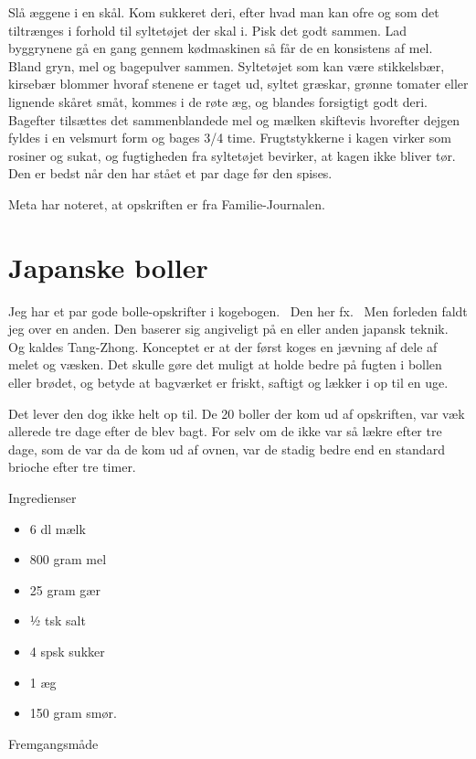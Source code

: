 \documentclass[
  letterpaper,
  DIV=11,
  numbers=noendperiod]{scrreprt}
\providecommand{\tightlist}{%
  \setlength{\itemsep}{0pt}\setlength{\parskip}{0pt}}\usepackage{longtable,booktabs,array}
\begin{document}
Slå æggene i en skål. Kom sukkeret deri, efter hvad man kan ofre og som
det tiltrænges i forhold til syltetøjet der skal i. Pisk det godt
sammen. Lad byggrynene gå en gang gennem kødmaskinen så får de en
konsistens af mel. Bland gryn, mel og bagepulver sammen. Syltetøjet som
kan være stikkelsbær, kirsebær blommer hvoraf stenene er taget ud,
syltet græskar, grønne tomater eller lignende skåret småt, kommes i de
røte æg, og blandes forsigtigt godt deri. Bagefter tilsættes det
sammenblandede mel og mælken skiftevis hvorefter dejgen fyldes i en
velsmurt form og bages 3/4 time. Frugtstykkerne i kagen virker som
rosiner og sukat, og fugtigheden fra syltetøjet bevirker, at kagen ikke
bliver tør. Den er bedst når den har stået et par dage før den spises.

Meta har noteret, at opskriften er fra Familie-Journalen.

\hypertarget{japanske-boller-1}{%
\section{Japanske boller}\label{japanske-boller-1}}

Jeg har et par gode bolle-opskrifter i kogebogen.~ Den her fx. ~Men
forleden faldt jeg over en anden. Den baserer sig angiveligt på en eller
anden japansk teknik. Og kaldes Tang-Zhong. Konceptet er at der først
koges en jævning af dele af melet og væsken. Det skulle gøre det muligt
at holde bedre på fugten i bollen eller brødet, og betyde at bagværket
er friskt, saftigt og lækker i op til en uge.

Det lever den dog ikke helt op til. De 20 boller der kom ud af
opskriften, var væk allerede tre dage efter de blev bagt. For selv om de
ikke var så lækre efter tre dage, som de var da de kom ud af ovnen, var
de stadig bedre end en standard brioche efter tre timer.

Ingredienser

\begin{itemize}
\tightlist
\item
  6 dl mælk
\item
  800 gram mel
\item
  25 gram gær
\item
  ½ tsk salt
\item
  4 spsk sukker
\item
  1 æg
\item
  150 gram smør.
\end{itemize}

Fremgangsmåde
\end{document}

